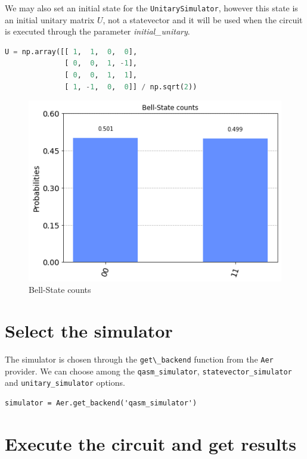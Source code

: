 \documentclass[a4paper,num-refs]{oup-contemporary}
\begin{document}
We may also set an initial state for the \verb|UnitarySimulator|, however this state is an initial unitary matrix $U$, not a statevector and it will be used when the circuit is executed through the parameter \textit{initial\_unitary}.

\begin{lstlisting}[language=Python]
U = np.array([[ 1,  1,  0,  0],
              [ 0,  0,  1, -1],
              [ 0,  0,  1,  1],
              [ 1, -1,  0,  0]] / np.sqrt(2))
\end{lstlisting}

\begin{figure}[bt!] %
\centering
\includegraphics[width=\linewidth]{aer_provider_8_0.png}
\caption{Bell-State counts}\label{fig:bell-state-counts}
\end{figure}

\section{Select the simulator}
The simulator is chosen through the \verb|get\_backend| function from the \verb|Aer| provider. We can choose among the \verb|qasm_simulator|, \verb|statevector_simulator| and \verb|unitary_simulator| options.
\begin{verbatim}
simulator = Aer.get_backend('qasm_simulator')   
\end{verbatim}

\section{Execute the circuit and get results}
\end{document}
